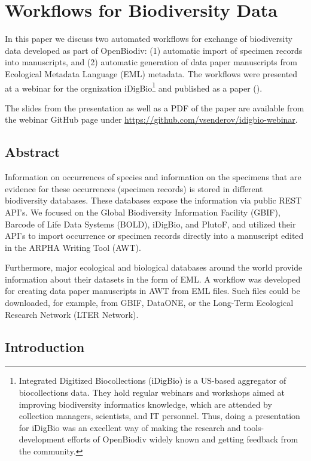 \chapter{Workflows for Biodiversity Data}
\label{chapter-case-study}

In this paper we discuss two automated workflows for exchange of biodiversity data developed as part of OpenBiodiv: (1) automatic import of specimen records into manuscripts, and (2) automatic generation of data paper manuscripts from Ecological Metadata Language (EML) metadata. The workflows were presented at a webinar for the orgnization iDigBio\footnote{Integrated Digitized Biocollections (iDigBio) is a US-based aggregator of biocollections data. They hold regular webinars and workshops aimed at improving biodiversity informatics knowledge, which are attended by collection managers, scientists, and IT personnel. Thus, doing a presentation for iDigBio was an excellent way of making the research and tools-development efforts of OpenBiodiv widely known and getting feedback from the community.} and published as a paper (\cite{senderov_online_2016}).

The slides from the presentation as well as a PDF of the paper are available from the webinar GitHub page under \url{https://github.com/vsenderov/idigbio-webinar}.

\section{Abstract}

Information on occurrences of species and information on the specimens that are evidence for these occurrences (specimen records) is stored in different biodiversity databases. These databases expose the information via public REST API's. We focused on the Global Biodiversity Information Facility (GBIF), Barcode of Life Data Systems (BOLD), iDigBio, and PlutoF, and utilized their API's to import occurrence or specimen records directly into a manuscript edited in the ARPHA Writing Tool (AWT).

Furthermore, major ecological and biological databases around the world provide information about their datasets in the form of EML. A workflow was developed for creating data paper manuscripts in AWT from EML files. Such files could be downloaded, for example, from GBIF, DataONE, or the Long-Term Ecological Research Network (LTER Network).

\section{Introduction}

